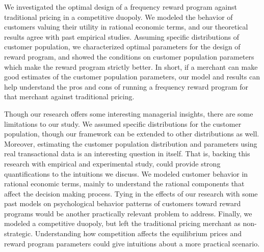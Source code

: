 We investigated the optimal design of a frequency reward program against traditional pricing in a competitive duopoly.
We modeled the behavior of customers valuing their utility in rational economic terms, and our theoretical results agree with past empirical studies.
Assuming specific distributions of customer population, we characterized optimal parameters for the design of reward program, and showed the conditions on customer population parameters which make the reward program strictly better.
In short, if a merchant can make good estimates of the customer population parameters, our model and results can help understand the pros and cons of running a frequency reward program for that merchant against traditional pricing.

Though our research offers some interesting managerial insights, there are some limitations to our study. 
We assumed specific distributions for the customer population, though our framework can be extended to other distributions as well.
Moreover, estimating the customer population distribution and parameters using real transactional data is an interesting question in itself.
That is, backing this research with empirical and experimental study, could provide strong quantifications to the intuitions we discuss.
We modeled customer behavior in rational economic terms, mainly to understand the rational components that affect the decision making process.
Tying in the effects of our research with some past models on psychological behavior patterns of customers toward reward programs would be another practically relevant problem to address.
Finally, we modeled a competitive duopoly, but left the traditional pricing merchant as non-strategic.
Understanding how competition affects the equilibrium prices and reward program parameters could give intuitions about a more practical scenario. 
